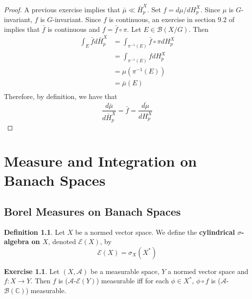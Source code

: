 \documentclass{book}
\theoremstyle{definition}
\newtheorem{defn}[definition]{Definition}
\newtheorem{ex}[definition]{Exercise}
\newcommand{\sig}{\sigma}
\newcommand{\C}{\mathbb{C}}
\newcommand{\MA}{\mathcal{A}}
\newcommand{\MB}{\mathcal{B}}
\newcommand{\ME}{\mathcal{E}}
\DeclareMathOperator*{\0}{\mbf{0}}
\DeclareMathOperator*{\1}{\mbf{1}}
\begin{document}
	\begin{proof}
	A previous exercise implies that $\bar{\mu} \ll \bar{H}_p^X$. Set $f = d \mu /d H_p^X$. Since $\mu$ is $G$-invariant, $f$ is $G$-invariant. Since $f$ is continuous, an exercise in section $9.2$ of \cite{analysis} implies that $\bar{f}$ is continuous and $f = \bar{f} \circ \pi$. Let $E \in \MB(X/G)$. Then 
	\begin{align*}
	\int_E \bar{f} d \bar{H}_p^X 
	&= \int_{\pi^{-1}(E)} \bar{f} \circ \pi dH_p^X \\
	&= \int_{\pi^{-1}(E)} f dH_p^X \\
	&= \mu(\pi^{-1}(E)) \\
	&= \bar{\mu}(E) \\
\end{align*}	 
	Therefore, by definition, we have that
	\begin{equation*}
	\frac{d \bar{\mu}}{d \bar{H}_p^X} = \bar{f} = \overline{\frac{d \mu}{d H_p^X}}
	\end{equation*}
	\end{proof}
	
	
	
	
	
	
	
	
	
	
	
	
	
	
	
	
	
	
	
	
	
	
	
	
	
	
	\newpage
	\chapter{Measure and Integration on Banach Spaces}
	
	\section{Borel Measures on Banach Spaces}
	
	\begin{defn}
		Let $X$ be a normed vector space. We define the \textbf{cylindrical $\sig$-algebra on $X$}, denoted $\ME(X)$, by $$\ME(X) = \sig_X(X^*)$$
	\end{defn}

	\begin{ex}
		Let $(X, \MA)$ be a measurable space, $Y$ a normed vector space and $f: X \rightarrow Y$. Then $f$ is ($\MA$-$\ME(Y)$) measurable iff for each $\phi \in X^*$, $\phi \circ f$ is ($\MA$-$\MB(\C)$) measurable. 
	\end{ex}
\end{document}
